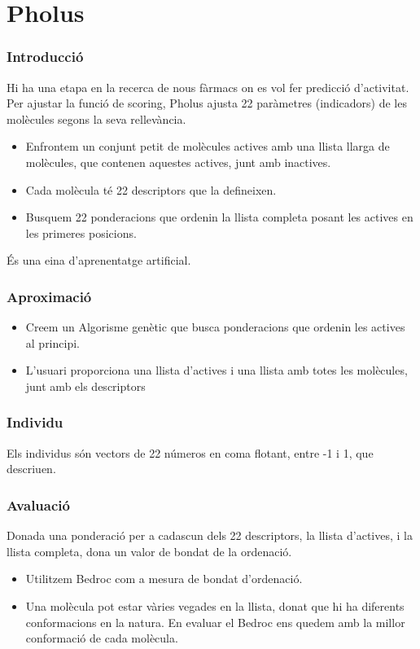 \documentclass{beamer}
\begin{document}
\section{Pholus} %
\label{sec:Pholus}

\begin{frame}
	\frametitle{Introducció}
	Hi ha una etapa en la recerca de nous fàrmacs on es vol fer predicció
	d'activitat.
	Per ajustar la funció de scoring, Pholus ajusta 22 paràmetres (indicadors)
	de les molècules segons la seva rellevància.
	\pause
	\begin{itemize}
		\item Enfrontem un conjunt petit de molècules actives amb una llista
		llarga de molècules, que contenen aquestes actives, junt amb inactives.
		\item Cada molècula té 22 descriptors que la defineixen.
		\item Busquem 22 ponderacions que ordenin la llista completa posant les
		actives en les primeres posicions.
	\end{itemize}
	És una eina d'aprenentatge artificial.
\end{frame}

\begin{frame}
\frametitle{Aproximació}
	\begin{itemize}
		\item Creem un Algorisme genètic que busca ponderacions que ordenin les actives al principi.
		\item L'usuari proporciona una llista d'actives i una llista amb totes les molècules, junt
			amb els descriptors
	\end{itemize}
\end{frame}


\begin{frame}
	\frametitle{Individu}
	Els individus són vectors de 22 números en coma flotant, entre -1 i 1, que descriuen.
\end{frame}

\begin{frame}
	\frametitle{Avaluació}
	\begin{block}{}
		Donada una ponderació per a cadascun dels 22 descriptors, la llista d'actives, i la llista
		completa, dona un valor de bondat de la ordenació.
	\end{block}
	\pause
	\begin{itemize}
		\item Utilitzem Bedroc com a mesura de bondat d'ordenació.
		\item Una molècula pot estar vàries vegades en la llista, donat que hi ha diferents
			conformacions en la natura.  En evaluar el Bedroc ens quedem amb la millor conformació
			de cada molècula.
	\end{itemize}
\end{frame}
\end{document}
